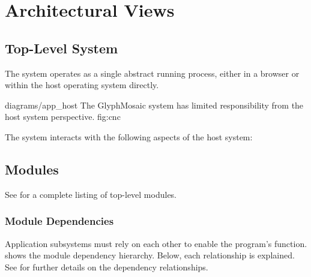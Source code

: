 \section{Architectural Views}
\label{sec:views}
\subsection{Top-Level System}
The system operates as a single abstract running process, either in a browser or within the host operating system directly.

\sidiagram
{diagrams/app_host}
{The GlyphMosaic system has limited responsibility from the host system perspective.}
{fig:cnc}
{\diagsize}

The system interacts with the following aspects of the host system:
\begin{itemize}
\end{itemize}


\subsection{Modules}
\label{sec:modules}
See  for a complete listing of top-level modules.


\subsubsection{Module Dependencies}
Application subsystems must rely on each other to enable the program's function.
 shows the module dependency hierarchy.
Below, each relationship is explained.
See  for further details on the dependency relationships.

